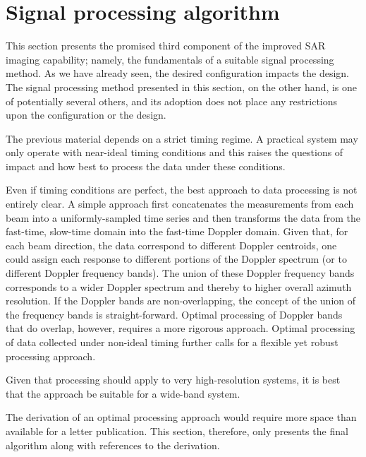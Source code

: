 \documentclass[journal]{IEEEtran}
\begin{document}
\section{Signal processing algorithm}
This section presents the promised third component of the improved SAR imaging capability; namely, the fundamentals of a suitable signal processing method. As we have already seen, the desired configuration impacts the design. The signal processing method presented in this section, on the other hand, is one of potentially several others, and its adoption does not place any restrictions upon the configuration or the design.  
\par
The previous material depends on a strict timing regime. A practical system may only operate with near-ideal timing conditions and this raises the questions of impact and how best to process the data under these conditions. 
\par
Even if timing conditions are perfect, the best approach to data processing is not entirely clear. A simple approach first concatenates the measurements from each beam into a uniformly-sampled time series and then transforms the data from the fast-time, slow-time domain into the fast-time Doppler domain. Given that, for each beam direction, the data correspond to different Doppler centroids, one could assign each response to different portions of the Doppler spectrum (or to different Doppler frequency bands). The union of these Doppler frequency bands corresponds to a wider Doppler spectrum and thereby to higher overall azimuth resolution. If the Doppler bands are non-overlapping, the concept of the union of the frequency bands is straight-forward. Optimal processing of Doppler bands that do overlap, however, requires a more rigorous approach. Optimal processing of data collected under non-ideal timing further calls for a flexible yet robust processing approach.
\par
Given that processing should apply to very high-resolution systems, it is best that the approach be suitable for a wide-band system. 
\par
The derivation of an optimal processing approach would require more space than available for a letter publication. This section, therefore, only presents the final algorithm along with references to the derivation.
\end{document}
